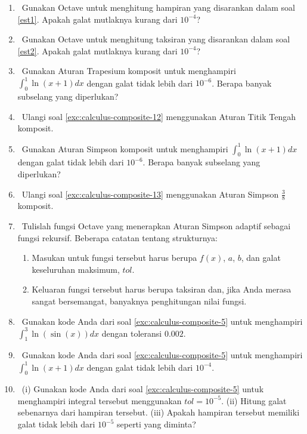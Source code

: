 \begin{enumerate}
\begin{enumerate}
\item Hampiri $I$ menggunakan Aturan Simpson.
\item \label{est2}Gunakan jawaban Anda untuk bagian (a) guna menaksir banyaknya
subselang yang diperlukan untuk menghampiri $I$ dengan galat tidak
lebih dari $10^{-4}$ menggunakan Aturan Simpson komposit. CATATAN:
$I=\frac{24\ln(5)-6\tan^{-1}(2)-4}{9}$.
\end{enumerate}
\item \label{exc:calculus-composite-19}\octave\ Gunakan Octave untuk menghitung
hampiran yang disarankan dalam soal \ref{est1}. Apakah galat mutlaknya
kurang dari $10^{-4}$? \hasananswer 
\item \octave\ Gunakan Octave untuk menghitung taksiran yang disarankan
dalam soal \ref{est2}. Apakah galat mutlaknya kurang dari $10^{-4}$?
\item \label{exc:calculus-composite-12}\octave\ Gunakan Aturan Trapesium
komposit untuk menghampiri ${\displaystyle \int_{0}^{1}\ln(x+1)dx}$
dengan galat tidak lebih dari $10^{-6}$. Berapa banyak subselang
yang diperlukan? \hasasolution 
\item \octave\ Ulangi soal \ref{exc:calculus-composite-12} menggunakan
Aturan Titik Tengah komposit.
\item \label{exc:calculus-composite-13}\octave\ Gunakan Aturan Simpson
komposit untuk menghampiri ${\displaystyle \int_{0}^{1}\ln(x+1)dx}$
dengan galat tidak lebih dari $10^{-6}$. Berapa banyak subselang
yang diperlukan?
\item \label{exc:calculus-composite-20}\octave\ Ulangi soal \ref{exc:calculus-composite-13}
menggunakan Aturan Simpson $\frac{3}{8}$ komposit. \hasananswer 
\item \octave\ \label{exc:calculus-composite-5}Tulislah fungsi Octave
yang menerapkan Aturan Simpson adaptif sebagai fungsi rekursif. Beberapa
catatan tentang strukturnya: \hasananswer 

\begin{enumerate}
\item Masukan untuk fungsi tersebut harus berupa $f(x)$, $a$, $b$, dan
galat keseluruhan maksimum, $tol$. 
\item Keluaran fungsi tersebut harus berupa taksiran dan, jika Anda merasa
sangat bersemangat, banyaknya penghitungan nilai fungsi.
\end{enumerate}
\item \label{exc:calculus-composite-21}\octave\ Gunakan kode Anda dari
soal \ref{exc:calculus-composite-5} untuk menghampiri $\int_{1}^{3}\ln(\sin(x))dx$
dengan toleransi $0.002$. \hasananswer 
\item \octave\ Gunakan kode Anda dari soal \ref{exc:calculus-composite-5}
untuk menghampiri ${\displaystyle \int_{0}^{1}\ln(x+1)dx}$ dengan
galat tidak lebih dari $10^{-4}$.
\item \label{exc:calculus-composite-23}\octave\ (i) Gunakan kode Anda
dari soal \ref{exc:calculus-composite-5} untuk menghampiri integral
tersebut menggunakan $tol=10^{-5}$. (ii) Hitung galat sebenarnya
dari hampiran tersebut. (iii) Apakah hampiran tersebut memiliki galat
tidak lebih dari $10^{-5}$ seperti yang diminta?


\end{enumerate}
